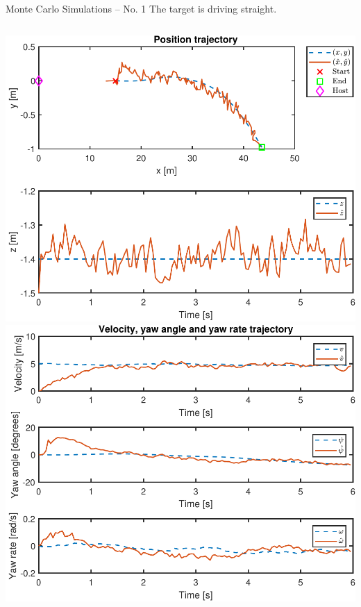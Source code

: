 \documentclass{beamer}
\begin{document}
\begin{frame}{Monte Carlo Simulations -- No. 1}
	The target is driving straight.
	\vspace{2em}
	\begin{columns}
	\includegraphics[width=\textwidth]{Traj/20_MC_TrajPos}
	\includegraphics[width=\textwidth]{Traj/20_MC_TrajOther}
	\end{columns}
\end{frame}
\end{document}
